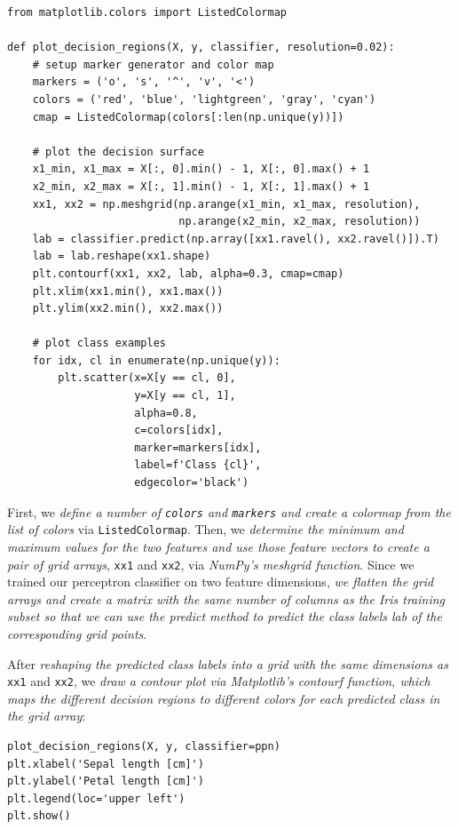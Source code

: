 \documentclass[../machine_learning_scikit.tex]{subfiles}
\begin{document}
    \begin{lstlisting}[caption={Plotting Regions on the Iris Dataset},label=figure_plotting_regions]
from matplotlib.colors import ListedColormap

def plot_decision_regions(X, y, classifier, resolution=0.02):
    # setup marker generator and color map
    markers = ('o', 's', '^', 'v', '<')
    colors = ('red', 'blue', 'lightgreen', 'gray', 'cyan')
    cmap = ListedColormap(colors[:len(np.unique(y))])

    # plot the decision surface
    x1_min, x1_max = X[:, 0].min() - 1, X[:, 0].max() + 1
    x2_min, x2_max = X[:, 1].min() - 1, X[:, 1].max() + 1
    xx1, xx2 = np.meshgrid(np.arange(x1_min, x1_max, resolution),
                           np.arange(x2_min, x2_max, resolution))
    lab = classifier.predict(np.array([xx1.ravel(), xx2.ravel()]).T)
    lab = lab.reshape(xx1.shape)
    plt.contourf(xx1, xx2, lab, alpha=0.3, cmap=cmap)
    plt.xlim(xx1.min(), xx1.max())
    plt.ylim(xx2.min(), xx2.max())

    # plot class examples
    for idx, cl in enumerate(np.unique(y)):
        plt.scatter(x=X[y == cl, 0],
                    y=X[y == cl, 1],
                    alpha=0.8,
                    c=colors[idx],
                    marker=markers[idx],
                    label=f'Class {cl}',
                    edgecolor='black')
    \end{lstlisting}

    First, we \textit{define a number of \lstinline|colors| and \lstinline|markers| and create a colormap from the list of colors} via \lstinline|ListedColormap|. Then, we \textit{determine the minimum and maximum values for the two features and use those feature vectors to create a pair of grid arrays}, \lstinline|xx1| and \lstinline|xx2|, via \textit{NumPy's meshgrid function}. Since we trained our perceptron classifier on two feature dimensions, \textit{we flatten the grid arrays and create a matrix with the same number of columns as the Iris training subset so that we can use the predict method to predict the class labels lab of the corresponding grid points}.

    After \textit{reshaping the predicted class labels into a grid with the same dimensions as} \lstinline|xx1| and \lstinline|xx2|, we \textit{draw a contour plot via Matplotlib's contourf function, which maps the different decision regions to different colors for each predicted class in the grid array}:

    \begin{lstlisting}[caption={Plotting the Perceptron Info on the Iris Dataset},label=figure:plotting_perceptron_iris_dataset]
plot_decision_regions(X, y, classifier=ppn)
plt.xlabel('Sepal length [cm]')
plt.ylabel('Petal length [cm]')
plt.legend(loc='upper left')
plt.show()
    \end{lstlisting}
\end{document}
